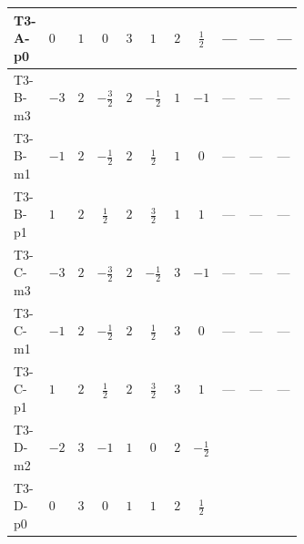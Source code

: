 \documentclass[8pt]{article}
\begin{document}
\begin{landscape}
\begin{longtable}{@{}llcccccc >{\raggedright\arraybackslash}p{0.21\linewidth} >{\raggedright\arraybackslash}p{0.21\linewidth} >{\raggedright\arraybackslash}p{0.21\linewidth}@{}}
\midrule
T3-A-p0 & $0$ & $1$ & $0$ & $3$ & $1$ & $2$ & $\frac{1}{2}$ & --- & --- & --- \\
\midrule
T3-B-m3 & $-3$ & $2$ & $-\frac{3}{2}$ & $2$ & $-\frac{1}{2}$ & $1$ & $-1$ & --- & --- & --- \\
\midrule
T3-B-m1 & $-1$ & $2$ & $-\frac{1}{2}$ & $2$ & $\frac{1}{2}$ & $1$ & $0$ & --- & --- & --- \\
\midrule
T3-B-p1 & $1$ & $2$ & $\frac{1}{2}$ & $2$ & $\frac{3}{2}$ & $1$ & $1$ & --- & --- & --- \\
\midrule
T3-C-m3 & $-3$ & $2$ & $-\frac{3}{2}$ & $2$ & $-\frac{1}{2}$ & $3$ & $-1$ & --- & --- & --- \\
\midrule
T3-C-m1 & $-1$ & $2$ & $-\frac{1}{2}$ & $2$ & $\frac{1}{2}$ & $3$ & $0$ & --- & --- & --- \\
\midrule
T3-C-p1 & $1$ & $2$ & $\frac{1}{2}$ & $2$ & $\frac{3}{2}$ & $3$ & $1$ & --- & --- & --- \\
\midrule
T3-D-m2 & $-2$ & $3$ & $-1$ & $1$ & $0$ & $2$ & $-\frac{1}{2}$ & \scriptsize\adjustbox{max width=\linewidth}{$\begin{gathered} {\lambda_{HS_1}^{(1)}} (2 T_{\nu}^{(1)}+6 \operatorname{Tr}\!\left({Y_d}\,\left({Y_d}\right)^{\dagger}\right)+2 \operatorname{Tr}\!\left({Y_e}\,\left({Y_e}\right)^{\dagger}\right)+6 \operatorname{Tr}\!\left({Y_u}\,\left({Y_u}\right)^{\dagger}\right)+4 {\lambda_{S_1}^{(A)}})\end{gathered}$} & \scriptsize\adjustbox{max width=\linewidth}{$\begin{gathered} +6 {g_2}^4\end{gathered}$} & \scriptsize\adjustbox{max width=\linewidth}{$\begin{gathered} +6 {\lambda_{HS_1}^{(A)}}^2\end{gathered}$} \\
\midrule
T3-D-p0 & $0$ & $3$ & $0$ & $1$ & $1$ & $2$ & $\frac{1}{2}$ & \scriptsize\adjustbox{max width=\linewidth}{$\begin{gathered} {\lambda_{HS_1}^{(1)}} (2 T_{\nu}^{(1)}+6 \operatorname{Tr}\!\left({Y_d}\,\left({Y_d}\right)^{\dagger}\right)+2 \operatorname{Tr}\!\left({Y_e}\,\left({Y_e}\right)^{\dagger}\right)+6 \operatorname{Tr}\!\left({Y_u}\,\left({Y_u}\right)^{\dagger}\right)+4 {\lambda_{S_1}^{(A)}})\end{gathered}$} & \scriptsize\adjustbox{max width=\linewidth}{$\begin{gathered} +6 {g_2}^4\end{gathered}$} & \scriptsize\adjustbox{max width=\linewidth}{$\begin{gathered} +6 {\lambda_{HS_1}^{(A)}}^2\end{gathered}$} \\

\end{longtable}
\end{landscape}
\end{document}
